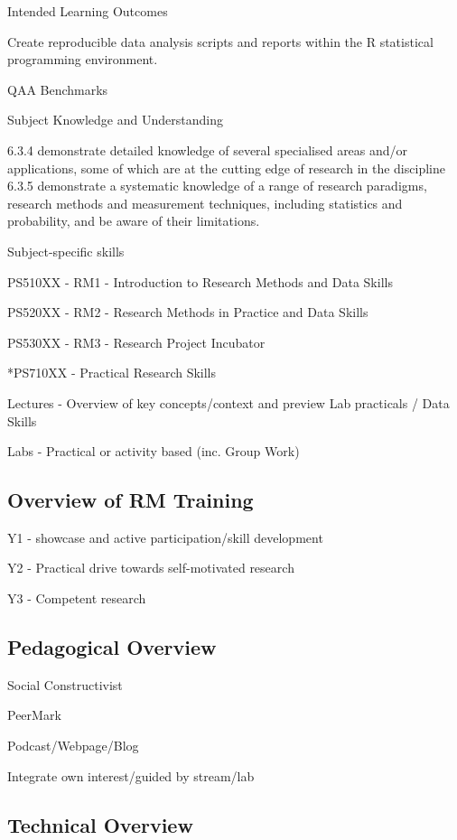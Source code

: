 \documentclass[
  11pt,
  letterpaper,
  oneside,
  open=any]{scrbook}
\begin{document}
Intended Learning Outcomes

Create reproducible data analysis scripts and reports within the R
statistical programming environment.

QAA Benchmarks

Subject Knowledge and Understanding

6.3.4 demonstrate detailed knowledge of several specialised areas and/or
applications, some of which are at the cutting edge of research in the
discipline 6.3.5 demonstrate a systematic knowledge of a range of
research paradigms, research methods and measurement techniques,
including statistics and probability, and be aware of their limitations.

Subject-specific skills

PS510XX - RM1 - Introduction to Research Methods and Data Skills

PS520XX - RM2 - Research Methods in Practice and Data Skills

PS530XX - RM3 - Research Project Incubator

*PS710XX - Practical Research Skills

Lectures - Overview of key concepts/context and preview Lab practicals /
Data Skills

Labs - Practical or activity based (inc. Group Work)

\hypertarget{overview-of-rm-training}{%
\subsection{Overview of RM Training}\label{overview-of-rm-training}}

Y1 - showcase and active participation/skill development

Y2 - Practical drive towards self-motivated research

Y3 - Competent research

\hypertarget{pedagogical-overview}{%
\subsection{Pedagogical Overview}\label{pedagogical-overview}}

Social Constructivist

PeerMark

Podcast/Webpage/Blog

Integrate own interest/guided by stream/lab

\hypertarget{technical-overview}{%
\subsection{Technical Overview}\label{technical-overview}}
\end{document}
